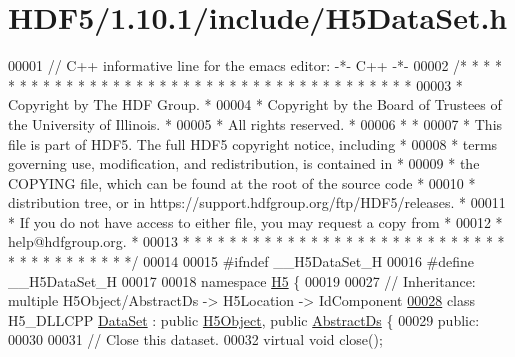 \hypertarget{_h_d_f5_21_810_81_2include_2_h5_data_set_8h_source}{}\section{H\+D\+F5/1.10.1/include/\+H5\+Data\+Set.h}
\label{_h_d_f5_21_810_81_2include_2_h5_data_set_8h_source}

\begin{DoxyCode}
00001 \textcolor{comment}{// C++ informative line for the emacs editor: -*- C++ -*-}
00002 \textcolor{comment}{/* * * * * * * * * * * * * * * * * * * * * * * * * * * * * * * * * * * * * * *}
00003 \textcolor{comment}{ * Copyright by The HDF Group.                                               *}
00004 \textcolor{comment}{ * Copyright by the Board of Trustees of the University of Illinois.         *}
00005 \textcolor{comment}{ * All rights reserved.                                                      *}
00006 \textcolor{comment}{ *                                                                           *}
00007 \textcolor{comment}{ * This file is part of HDF5.  The full HDF5 copyright notice, including     *}
00008 \textcolor{comment}{ * terms governing use, modification, and redistribution, is contained in    *}
00009 \textcolor{comment}{ * the COPYING file, which can be found at the root of the source code       *}
00010 \textcolor{comment}{ * distribution tree, or in https://support.hdfgroup.org/ftp/HDF5/releases.  *}
00011 \textcolor{comment}{ * If you do not have access to either file, you may request a copy from     *}
00012 \textcolor{comment}{ * help@hdfgroup.org.                                                        *}
00013 \textcolor{comment}{ * * * * * * * * * * * * * * * * * * * * * * * * * * * * * * * * * * * * * * */}
00014 
00015 \textcolor{preprocessor}{#ifndef \_\_H5DataSet\_H}
00016 \textcolor{preprocessor}{#define \_\_H5DataSet\_H}
00017 
00018 \textcolor{keyword}{namespace }\hyperlink{namespace_h5}{H5} \{
00019 
00027 \textcolor{comment}{//  Inheritance: multiple H5Object/AbstractDs -> H5Location -> IdComponent}
\hyperlink{class_h5_1_1_data_set}{00028} \textcolor{keyword}{class }H5\_DLLCPP \hyperlink{class_h5_1_1_data_set}{DataSet} : \textcolor{keyword}{public} \hyperlink{class_h5_1_1_h5_object}{H5Object}, \textcolor{keyword}{public} \hyperlink{class_h5_1_1_abstract_ds}{AbstractDs} \{
00029    \textcolor{keyword}{public}:
00030 
00031         \textcolor{comment}{// Close this dataset.}
00032         \textcolor{keyword}{virtual} \textcolor{keywordtype}{void} close();

\end{DoxyCode}
